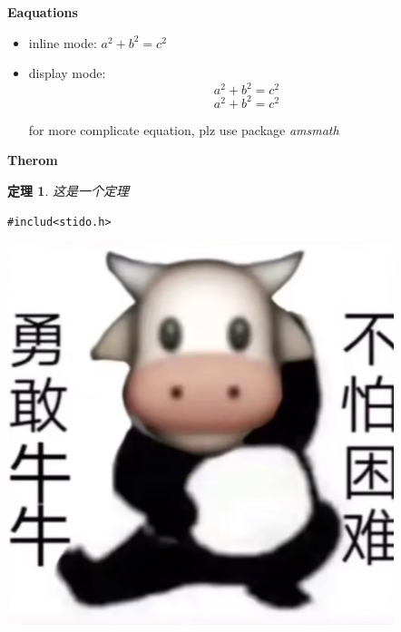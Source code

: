 \documentclass{article}
\newtheorem{thm}{定理}[section]     %
\begin{document}
    \textbf{Eaquations}

    \begin{itemize}
        \item inline mode:    %
        $a^2+b^2=c^2$ 

        \item display mode:   
        \[a^2+b^2=c^2\]        %
        \begin{equation}       %
            a^2+b^2=c^2
        \end{equation}

        
        for more complicate equation, plz use package \emph{amsmath}
    
    \end{itemize}


    \textbf{Therom}

    \begin{thm}
        这是一个定理
    \end{thm}
    

    \begin{lstlisting}[breaklines=true,backgroundcolor=\color{lightgray},title=Code]
        #includ<stido.h>
    \end{lstlisting}

    \begin{center}  %
        \includegraphics[scale=0.2]{picture.jpeg}   %
    \end{center}

     
\end{document}

